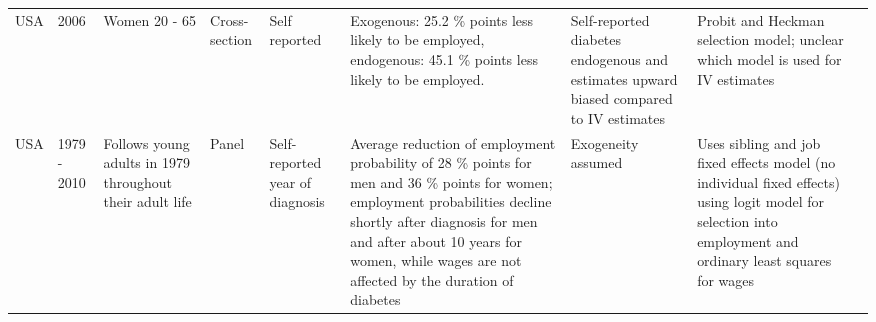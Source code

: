 \documentclass[12pt,english]{article}
\begin{document}
{\begin{landscape}
\begin{tabularx}{\linewidth}{m m m m b b b b m}
			USA       & 2006       & Women 20 - 65                                                      & Cross-section           & Self reported                                & Exogenous: 25.2 \% points less likely to be employed, endogenous: 45.1 \% points less likely to be employed.                                                                                                                                                                                                                                                                                                                                                                                                                                                                                                                                                     & Self-reported diabetes endogenous and estimates upward biased compared to IV estimates  & Probit and Heckman selection model; unclear which model is used for IV estimates                                                                                                                                                                                                                     & \textcite{Minor2011}                     \\
			USA       & 1979 - 2010  & Follows young adults in 1979 throughout their adult life         & Panel                   & Self-reported year of diagnosis              & Average reduction of employment probability of 28 \% points for men and 36 \% points for women; employment probabilities decline shortly after diagnosis for men and after about 10 years for women, while wages are not affected by the duration of diabetes                                                                                                                                                                                                                                                                                                                                                                                                    & Exogeneity assumed                                                                      & Uses sibling and job fixed effects model (no individual fixed effects) using logit model for selection into employment and ordinary least squares for wages                                                                                                                                          & \textcite{Minor2013}                    \\

\end{tabularx}
\end{landscape}}
\end{document}
